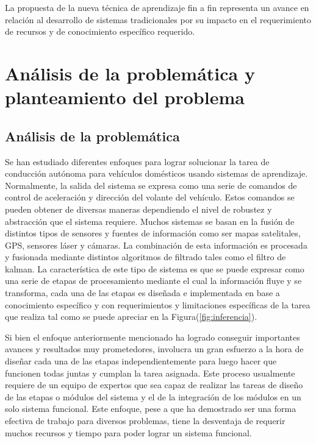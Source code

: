 \documentclass[12pt,letterpaper]{article}
\begin{document}
La propuesta de la nueva técnica de aprendizaje fin a fin representa un avance en relación al desarrollo de sistemas 
tradicionales por su impacto en el requerimiento de recursos y de conocimiento específico requerido.


\section{Análisis de la problemática y \\
planteamiento del problema}
\subsection{Análisis de la problemática}

Se han estudiado diferentes enfoques para lograr solucionar la tarea de 
conducción autónoma para vehículos domésticos usando sistemas de aprendizaje. Normalmente, la salida del 
sistema se expresa como una serie de comandos de control de aceleración y dirección 
del volante del vehículo. Estos comandos se pueden obtener de diversas maneras dependiendo 
el nivel de robustez y abstracción que el sistema requiere. Muchos sistemas 
se basan en la fusión de distintos tipos de sensores y fuentes de información como ser 
mapas satelitales, GPS, sensores láser y cámaras. La combinación de esta información 
es procesada y fusionada mediante distintos algoritmos de filtrado tales como el filtro de kalman. 
La característica de este tipo de sistema es que se puede expresar como una serie de etapas 
de procesamiento mediante el cual la información fluye y se transforma, cada una de las etapas es 
diseñada e implementada en base a conocimiento específico y con requerimientos y limitaciones específicas 
de la tarea que realiza tal como se puede apreciar en la Figura(\ref{fig:inferencia}).

Si bien el enfoque anteriormente mencionado ha logrado conseguir importantes avances y resultados 
muy prometedores, involucra un gran esfuerzo a la hora de diseñar cada una de las etapas independientemente 
para luego hacer que funcionen todas juntas y cumplan la tarea asignada. Este proceso usualmente requiere 
de un equipo de expertos que sea capaz de realizar las tareas de diseño de las etapas o módulos del sistema 
y el de la integración de los módulos en un solo sistema funcional. Este enfoque, pese a que ha demostrado ser 
una forma efectiva de trabajo para diversos problemas, tiene la desventaja de requerir muchos 
recursos y tiempo para poder lograr un sistema funcional. 
\end{document}
